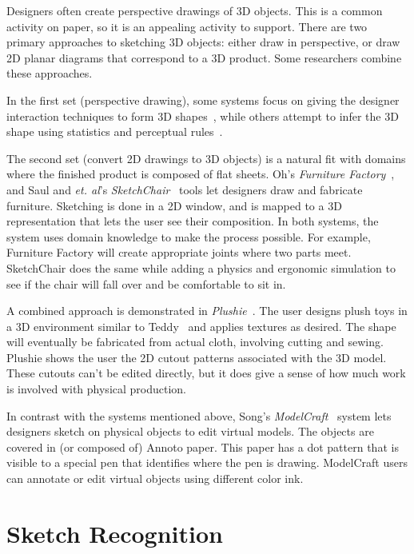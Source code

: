 

Designers often create perspective drawings of 3D objects. This is a
common activity on paper, so it is an appealing activity to
support. There are two primary approaches to sketching 3D objects:
either draw in perspective, or draw 2D planar diagrams that correspond
to a 3D product. Some researchers combine these approaches.

In the first set (perspective drawing), some systems focus on giving
the designer interaction techniques to form 3D
shapes~\cite{kara-3d-styling,bloomenthal-sketch-n-make}, while others
attempt to infer the 3D shape using statistics and perceptual
rules~\cite{lipson-correlation}. 

The second set (convert 2D drawings to 3D objects) is a natural fit
with domains where the finished product is composed of flat
sheets. Oh's \textit{Furniture Factory}~\cite{oh-fab}, and Saul and
\textit{et. al}'s \textit{SketchChair}~\cite{saul-sketch-chair} tools
let designers draw and fabricate furniture. Sketching is done in a 2D
window, and is mapped to a 3D representation that lets the user see
their composition. In both systems, the system uses domain knowledge
to make the process possible. For example, Furniture Factory will
create appropriate joints where two parts meet. SketchChair does the
same while adding a physics and ergonomic simulation to see if the
chair will fall over and be comfortable to sit in.

A combined approach is demonstrated in
\textit{Plushie}~\cite{mori-plushie}. The user designs plush toys in a
3D environment similar to Teddy~\cite{igarashi-teddy} and applies
textures as desired. The shape will eventually be fabricated from
actual cloth, involving cutting and sewing. Plushie shows the user the
2D cutout patterns associated with the 3D model. These cutouts can't
be edited directly, but it does give a sense of how much work is
involved with physical production.

In contrast with the systems mentioned above, Song's
\textit{ModelCraft}~\cite{song-modelcraft} system lets designers
sketch on physical objects to edit virtual models. The objects are
covered in (or composed of) Annoto paper. This paper has a dot pattern
that is visible to a special pen that identifies where the pen is
drawing. ModelCraft users can annotate or edit virtual objects using
different color ink. 

\section{Sketch Recognition}

